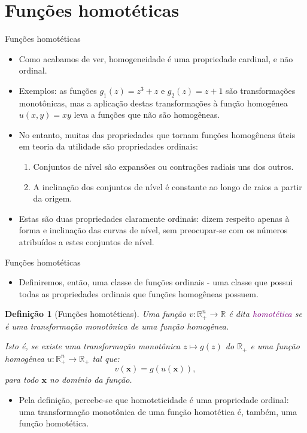 \documentclass[10pt]{beamer}
\newtheorem{defi}{Definição}
\begin{document}
\section{Funções homotéticas}
\begin{frame}{Funções homotéticas}
    \begin{itemize}
        \item Como acabamos de ver, homogeneidade é uma propriedade cardinal, e não ordinal.
        \bigskip
        \item Exemplos: as funções $g_1(z) = z^3 + z$ e $g_2(z) = z + 1$ são transformações monotônicas, mas a aplicação destas transformações à função homogênea $u(x,y) = xy$ leva a funções que não são homogêneas.
        \bigskip
        \item No entanto, muitas das propriedades que tornam funções homogêneas úteis em teoria da utilidade são propriedades ordinais:
        \bigskip
        \begin{enumerate}
            \item Conjuntos de nível são expansões ou contrações radiais uns dos outros.
            \bigskip
            \item A inclinação dos conjuntos de nível é constante ao longo de raios a partir da origem.
        \end{enumerate}
        \bigskip
        \item Estas são duas propriedades claramente ordinais: dizem respeito apenas à forma e inclinação das curvas de nível, sem preocupar-se com os números atribuídos a estes conjuntos de nível.
    \end{itemize}
\end{frame}

\begin{frame}{Funções homotéticas}
    \begin{itemize}
        \item Definiremos, então, uma classe de funções ordinais - uma classe que possui todas as propriedades ordinais que funções homogêneas possuem.
    \end{itemize}
    \begin{defi}[Funções homotéticas]
        Uma função $v: \mathbb{R}_+^n \to \mathbb{R}$ é dita \textcolor{purple}{homotética} se é uma transformação monotônica de uma função homogênea.

        Isto é, se existe uma transformação monotônica $z \mapsto g(z)$ do $\mathbb{R}_+$ e uma função homogênea $u: \mathbb{R}_+^n \to \mathbb{R}_+$ tal que:
        \[
          v(\mathbf{x}) = g(u(\mathbf{x})),  
        \]
        para todo $\mathbf{x}$ no domínio da função.
    \end{defi}
    \begin{itemize}
        \item Pela definição, percebe-se que homoteticidade é uma propriedade ordinal: uma transformação monotônica de uma função homotética é, também, uma função homotética.
    \end{itemize}
\end{frame}
\end{document}
